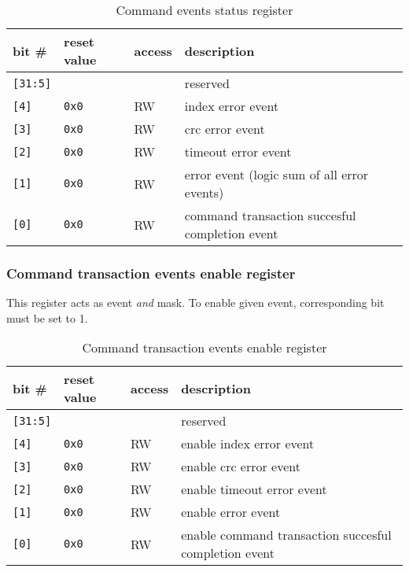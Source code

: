     \begin{table}[H]
    \caption{Command events status register}
        \begin{tabular}{m{1.3cm}|m{2cm}|m{1cm}|m{8cm}}
                \rowcolor[gray]{0.7} bit \# & reset value & access & description \\ \hline \hline
                \texttt{[31:5]} & & & reserved \\ \hline
                \texttt{[4]} & \texttt{0x0} & RW & index error event \\ \hline
                \texttt{[3]} & \texttt{0x0} & RW & crc error event \\ \hline
                \texttt{[2]} & \texttt{0x0} & RW & timeout error event \\ \hline
                \texttt{[1]} & \texttt{0x0} & RW & error event (logic sum of all error events) \\ \hline
                \texttt{[0]} & \texttt{0x0} & RW & command transaction succesful completion event \\ \hline
                \hline
        \end{tabular}
        \label{tab:cmd_evt_reg}
    \end{table}
    
    \subsubsection{Command transaction events enable register}
    \label{sec:cmd_ena_reg}
    
    This register acts as event \textit{and} mask. To enable given event, corresponding bit must be set to 1.
    
    \begin{table}[H]
    \caption{Command transaction events enable register}
        \begin{tabular}{m{1.3cm}|m{2cm}|m{1cm}|m{8cm}}
                \rowcolor[gray]{0.7} bit \# & reset value & access & description \\ \hline \hline
                \texttt{[31:5]} & & & reserved \\ \hline
                \texttt{[4]} & \texttt{0x0} & RW & enable index error event \\ \hline
                \texttt{[3]} & \texttt{0x0} & RW & enable crc error event \\ \hline
                \texttt{[2]} & \texttt{0x0} & RW & enable timeout error event \\ \hline
                \texttt{[1]} & \texttt{0x0} & RW & enable error event \\ \hline
                \texttt{[0]} & \texttt{0x0} & RW & enable command transaction succesful completion event \\ \hline
                \hline
        \end{tabular}
        \label{tab:cmd_ena_reg}
    \end{table}
    
